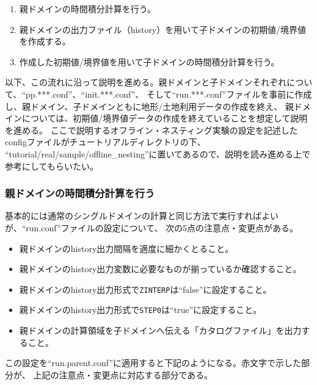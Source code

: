 {\gt
\begin{enumerate}
 \item 親ドメインの時間積分計算を行う。
 \item 親ドメインの出力ファイル（history）を用いて子ドメインの初期値/境界値を作成する。
 \item 作成した初期値/境界値を用いて子ドメインの時間積分計算を行う。
\end{enumerate}
}

以下、この流れに沿って説明を進める。親ドメインと子ドメインそれぞれについて、``pp.***.conf''、``init.***.conf''、
そして``run.***.conf''ファイルを事前に作成し、親ドメイン、子ドメインともに地形/土地利用データの作成を終え、
親ドメインについては、初期値/境界値データの作成を終えていることを想定して説明を進める。
ここで説明するオフライン・ネスティング実験の設定を記述したconfigファイルがチュートリアルディレクトリの下、
``tutorial/real/sample/offline\_nesting''に置いてあるので、説明を読み進める上で参考にしてもらいたい。

\subsubsection{親ドメインの時間積分計算を行う}
基本的には通常のシングルドメインの計算と同じ方法で実行すればよいが、``run.conf''ファイルの設定について、
次の5点の注意点・変更点がある。

\begin{itemize}
 \item 親ドメインのhistory出力間隔を適度に細かくとること。
 \item 親ドメインのhistory出力変数に必要なものが揃っているか確認すること。
 \item 親ドメインのhistory出力形式で\verb|ZINTERP|は``false''に設定すること。
 \item 親ドメインのhistory出力形式で\verb|STEP0|は``true''に設定すること。
 \item 親ドメインの計算領域を子ドメインへ伝える「カタログファイル」を出力すること。
\end{itemize}


この設定を``run.parent.conf''に適用すると下記のようになる。赤文字で示した部分が、
上記の注意点・変更点に対応する部分である。\\

